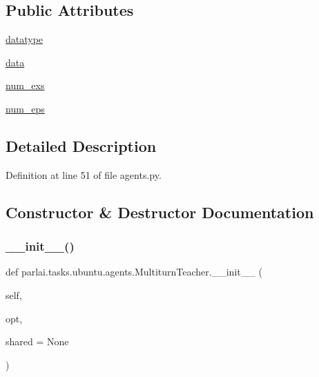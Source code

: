 \subsection*{Public Attributes}
\begin{DoxyCompactItemize}
\item 
\hyperlink{classparlai_1_1tasks_1_1ubuntu_1_1agents_1_1MultiturnTeacher_a6e07d1f855fea7080206ec095407065c}{datatype}
\item 
\hyperlink{classparlai_1_1tasks_1_1ubuntu_1_1agents_1_1MultiturnTeacher_a0746041b61b1174f04efa5e19c6ec55d}{data}
\item 
\hyperlink{classparlai_1_1tasks_1_1ubuntu_1_1agents_1_1MultiturnTeacher_a71904bff60bd65a5f4cad98df1f55a3b}{num\+\_\+exs}
\item 
\hyperlink{classparlai_1_1tasks_1_1ubuntu_1_1agents_1_1MultiturnTeacher_a6b629627b3d8a7e0a5c05e4265e50c35}{num\+\_\+eps}
\end{DoxyCompactItemize}


\subsection{Detailed Description}


Definition at line 51 of file agents.\+py.



\subsection{Constructor \& Destructor Documentation}
\mbox{\label{classparlai_1_1tasks_1_1ubuntu_1_1agents_1_1MultiturnTeacher_acf41b09581b173c90820787ebe77116e}} 
\subsubsection{\texorpdfstring{\+\_\+\+\_\+init\+\_\+\+\_\+()}{\_\_init\_\_()}}
{\footnotesize\ttfamily def parlai.\+tasks.\+ubuntu.\+agents.\+Multiturn\+Teacher.\+\_\+\+\_\+init\+\_\+\+\_\+ (\begin{DoxyParamCaption}\item[{}]{self,  }\item[{}]{opt,  }\item[{}]{shared = {\ttfamily None} }\end{DoxyParamCaption})}




